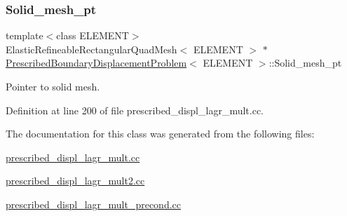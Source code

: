 \subsubsection{\texorpdfstring{Solid\+\_\+mesh\+\_\+pt}{Solid\_mesh\_pt}}
{\footnotesize\ttfamily template$<$class E\+L\+E\+M\+E\+NT$>$ \\
Elastic\+Refineable\+Rectangular\+Quad\+Mesh$<$ E\+L\+E\+M\+E\+NT $>$ $\ast$ \hyperlink{classPrescribedBoundaryDisplacementProblem}{Prescribed\+Boundary\+Displacement\+Problem}$<$ E\+L\+E\+M\+E\+NT $>$\+::Solid\+\_\+mesh\+\_\+pt\hspace{0.3cm}{\ttfamily [private]}}



Pointer to solid mesh. 



Definition at line 200 of file prescribed\+\_\+displ\+\_\+lagr\+\_\+mult.\+cc.



The documentation for this class was generated from the following files\+:\begin{DoxyCompactItemize}
\item 
\hyperlink{prescribed__displ__lagr__mult_8cc}{prescribed\+\_\+displ\+\_\+lagr\+\_\+mult.\+cc}\item 
\hyperlink{prescribed__displ__lagr__mult2_8cc}{prescribed\+\_\+displ\+\_\+lagr\+\_\+mult2.\+cc}\item 
\hyperlink{prescribed__displ__lagr__mult__precond_8cc}{prescribed\+\_\+displ\+\_\+lagr\+\_\+mult\+\_\+precond.\+cc}\end{DoxyCompactItemize}
